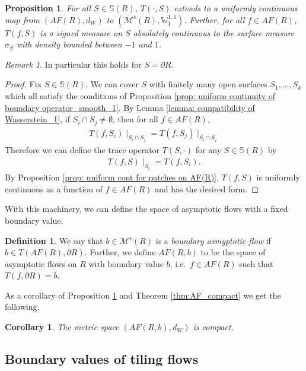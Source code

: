 \documentclass[11pt]{article}
\newtheorem{prop}[thm]{Proposition}
\newtheorem{cor}[thm]{Corollary}
\theoremstyle{remark}
\newtheorem{rem}[thm]{Remark}
\theoremstyle{definition}
\newtheorem{definition}[thm]{Definition}
\newcommand{\mc}[1]{\mathcal{#1}}
\newcommand{\m}[1]{\mathbb{#1}}
\begin{document}
\begin{prop}\label{prop:uniformly_continuous_AF(R)}
For all $S\in \m S(R)$, $T(\cdot,S)$ extends to a uniformly continuous map from $(AF(R),d_W)$ to $(\mc M^s(R),\m W_1^{1,1})$. Further, for all $f\in AF(R)$, $T(f, S)$ is a signed measure on $S$ absolutely continuous to the surface measure $\sigma_S$ with density bounded between $-1$ and $1$.
\end{prop}
\begin{rem}
    In particular this holds for $S=\partial R$.
\end{rem}
\begin{proof}
    Fix $S\in \m S(R)$. We can cover $S$ with finitely many open surfaces $S_1,...,S_k$ which all satisfy the conditions of Proposition \ref{prop: uniform continuity of boundary operator_smooth_1}. By Lemma \ref{lemma: compatibility of Wasserstein_1}, if $S_i\cap S_j\neq \emptyset$, then for all $f\in AF(R)$, 
    \begin{align*}
        T(f,S_i)\mid_{S_i\cap S_j} = T(f,S_j)\mid_{S_i\cap S_j}
    \end{align*}
    Therefore we can define the trace operator $T(S,\cdot)$ for any $S\in \m S(R)$ by 
    \begin{align*}
        T(f,S) \mid_{S_i} = T(f,S_i). 
    \end{align*}
    By Proposition \ref{prop: uniform cont for patches on AF(R)}, $T(f,S)$ is uniformly continuous as a function of $f\in AF(R)$ and has the desired form. 
\end{proof}

With this machinery, we can define the space of asymptotic flows with a fixed boundary value. 


\begin{definition}\label{def:boundary_asymptotic_flow}
    We say that $b\in \mc M^s(R)$ is a \textit{boundary asmyptotic flow} if $b \in T(AF(R),\partial R)$. Further, we define $AF(R,b)$ to be the space of asymptotic flows on $R$ with boundary value $b$, i.e.\ $f\in AF(R)$ such that $T(f,\partial R) = b$.
\end{definition}

As a corollary of Proposition \ref{prop:uniformly_continuous_AF(R)} and Theorem \ref{thm:AF_compact} we get the following. 

\begin{cor}\label{cor: AF(R,b) compact}
    The metric space $(AF(R,b),d_W)$ is compact.
\end{cor}

\subsection{Boundary values of tiling flows}\label{sec: boundary values of tiling flows}
 
\end{document}
